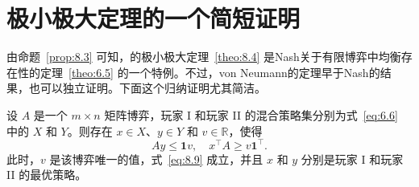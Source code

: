 \section{极小极大定理的一个简短证明}\label{sec:8.4}

由命题~\ref{prop:8.3} 可知，\citet{vonneumann1928}的极小极大定理~\ref{theo:8.4} 是Nash关于有限博弈中均衡存在性的定理~\ref{theo:6.5} 的一个特例。不过，von Neumann的定理早于Nash的结果，也可以独立证明。下面这个归纳证明尤其简洁。

\begin{theorem}\label{theo:8.5}
设 \(A\) 是一个 \(m\times n\) 矩阵博弈，玩家 I 和玩家 II 的混合策略集分别为式~\eqref{eq:6.6} 中的 \(X\) 和 \(Y\)。则存在 \(x\in X\)、\(y\in Y\) 和 \(v\in\mathbb{R}\)，使得
\[
Ay\leq\mathbf{1}v,\quad x^{\top}A\geq v\mathbf{1}^{\top}.
\]
此时，\(v\) 是该博弈唯一的值，式~\eqref{eq:8.9} 成立，并且 \(x\) 和 \(y\) 分别是玩家 I 和玩家 II 的最优策略。
\end{theorem}

